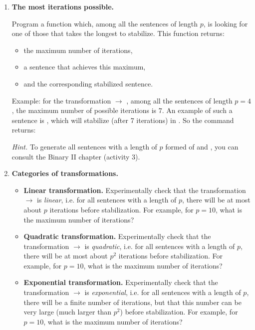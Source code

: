 \documentclass[11pt,class=report,crop=false]{standalone}
\begin{document}
\begin{activite}
\begin{enumerate}
	\item \textbf{The most iterations possible.}
	
	Program a  function
which, among all the sentences of length $p$, is looking for one of those that takes the longest to stabilize. This function returns:
\begin{itemize}
  \item the maximum number of iterations,
  \item a sentence that achieves this maximum,
  \item and the corresponding stabilized sentence.
\end{itemize}

Example: for the transformation \rzero\run{} $\rightarrow$ \run\rzero\rzero, among all the sentences of length $p=4$, the maximum number of possible iterations is $7$. An example of such a sentence is \rzero\run\run\run, which will stabilize (after 7 iterations) in \run\run\run\rzero\rzero\rzero\rzero\rzero\rzero\rzero\rzero.
So the  command returns: 


  \emph{Hint.} To generate all sentences with a length of $p$ formed of \rzero{} and \run{}, you can consult the \og{}Binary II\fg{} chapter (activity 3).

	\item \textbf{Categories of transformations.}
	
	\begin{itemize} 
	\item \textbf{Linear transformation.}
	Experimentally check that the transformation \rzero\rzero\run\run{} $\rightarrow$\run\run\rzero{} is \emph{linear}, i.e. for all sentences with a length of $p$, there will be at most about $p$ iterations before stabilization. For example, for $p=10$, what is the maximum number of iterations?
	
	\item \textbf{Quadratic transformation.}
	Experimentally check that the transformation \rzero\run{} $\rightarrow$\run\rzero{} is \emph{quadratic}, i.e. for all sentences with a length of $p$, there will be at most about $p^2$ iterations before stabilization. For example, for $p=10$, what is the maximum number of iterations?
	
	\item \textbf{Exponential transformation.}
	Experimentally check that the transformation \rzero\run{} $\rightarrow$\run\run\rzero{} is \emph{exponential}, i.e. for all sentences with a length of $p$, there will be a finite number of iterations, but that this number can be very large (much larger than $p^2$) before stabilization. For example, for $p=10$, what is the maximum number of iterations?	


\end{itemize}
\end{enumerate}
\end{activite}
\end{document}
